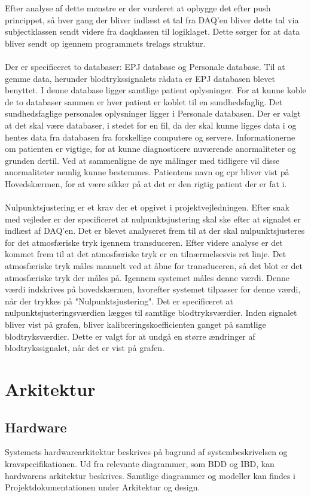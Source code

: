 Efter analyse af dette mønstre er der vurderet at opbygge det efter push princippet, så hver gang der bliver indlæst et tal fra DAQ’en bliver dette tal via subjectklassen sendt videre fra daqklassen til logiklaget. Dette sørger for at data bliver sendt op igennem programmets trelags struktur. \\\\
Der er specificeret to databaser: EPJ database og Personale database. Til at gemme data, herunder blodtrykssignalets rådata er EPJ databasen blevet benyttet. I denne database ligger samtlige patient oplysninger. For at kunne koble de to databaser sammen er hver patient er koblet til en sundhedsfaglig. Det sundhedsfaglige personales oplysninger ligger i Personale databasen. Der er valgt at det skal være databaser, i stedet for en fil, da der skal kunne ligges data i og hentes data fra databasen fra forskellige computere og servere. Informationerne om patienten er vigtige, for at kunne diagnosticere nuværende anormaliteter og grunden dertil. Ved at sammenligne de nye målinger med tidligere vil disse anormaliteter nemlig kunne bestemmes. Patientens navn og cpr bliver vist på Hovedskærmen, for at være sikker på at det er den rigtig patient der er fat i. \\\\
Nulpunktsjustering er et krav der et opgivet i projektvejledningen. Efter snak med vejleder er der specificeret at nulpunktsjustering skal ske efter at signalet er indlæst af DAQ’en. Det er blevet analyseret frem til at der skal nulpunktsjusteres for det atmosfæriske tryk igennem transduceren. Efter videre analyse er det kommet frem til at det atmosfæriske tryk er en tilnærmelsesvis ret linje. Det atmosfæriske tryk måles manuelt ved at åbne for transduceren, så det blot er det atmosfæriske tryk der måles på. Igennem systemet måles denne værdi. Denne værdi indskrives på hovedskærmen, hvorefter systemet tilpasser for denne værdi, når der trykkes på "Nulpunktsjustering". Det er specificeret at nulpunktsjusteringsværdien lægges til samtlige blodtryksværdier. Inden signalet bliver vist på grafen, bliver kalibreringskoefficienten ganget på samtlige blodtryksværdier. Dette er valgt for at undgå en større ændringer af blodtrykssignalet, når det er vist på grafen.  
\section{Arkitektur}
\subsection{Hardware}
Systemets hardwarearkitektur beskrives på bagrund af systembeskrivelsen og kravspecifikationen. Ud fra relevante diagrammer, som BDD og IBD, kan hardwarens arkitektur beskrives. Samtlige diagrammer og modeller kan findes i Projektdokumentationen under Arkitektur og design. 
